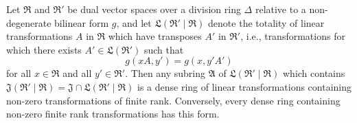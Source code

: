 Let $\mathfrak{R}$ and $\mathfrak{R}'$ be dual vector spaces over a division ring $\Delta$ relative to a non-degenerate bilinear form $g$, and let $\mathfrak{L}(\mathfrak{R}' \mid \mathfrak{R})$ denote the totality of linear transformations $A$ in $\mathfrak{R}$ which have transposes $A'$ in $\mathfrak{R}'$, i.e., transformations for which there exists $A' \in \mathfrak{L}(\mathfrak{R}')$ such that
$$g(xA, y') = g(x, y'A')$$
for all $x \in \mathfrak{R}$ and all $y' \in \mathfrak{R}'$. Then any subring $\mathfrak{A}$ of $\mathfrak{L}(\mathfrak{R}' \mid \mathfrak{R})$ which contains $\mathfrak{J}(\mathfrak{R}' \mid \mathfrak{R}) = \mathfrak{J} \cap \mathfrak{L}(\mathfrak{R}' \mid \mathfrak{R})$ is a dense ring of linear transformations containing non-zero transformations of finite rank. Conversely, every dense ring containing non-zero finite rank transformations has this form.
